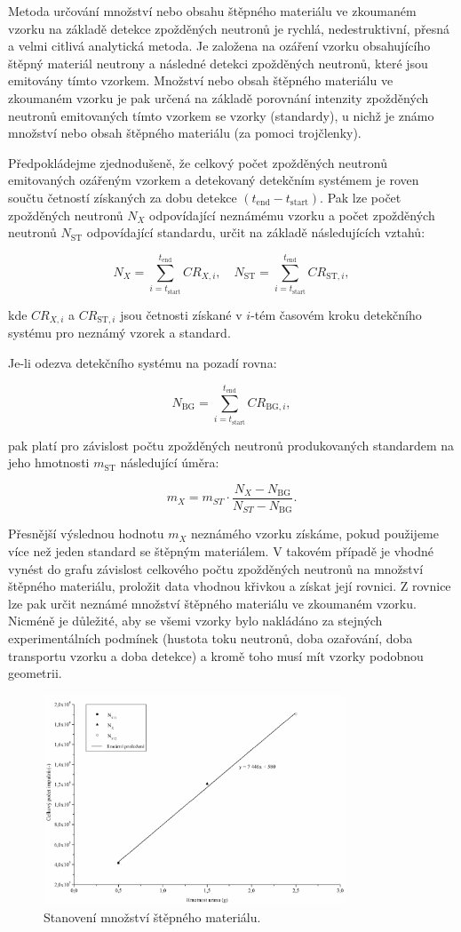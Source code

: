 Metoda určování množství nebo obsahu štěpného materiálu ve zkoumaném vzorku na základě detekce zpožděných neutronů je rychlá, nedestruktivní, přesná a velmi citlivá analytická metoda. Je založena na ozáření vzorku obsahujícího štěpný materiál neutrony a následné detekci zpožděných neutronů, které jsou emitovány tímto vzorkem. Množství nebo obsah štěpného materiálu ve zkoumaném vzorku je pak určená na základě porovnání intenzity zpožděných neutronů emitovaných tímto vzorkem se vzorky (standardy), u nichž je známo množství nebo obsah štěpného materiálu (za pomoci trojčlenky).

Předpokládejme zjednodušeně, že celkový počet zpožděných neutronů emitovaných ozářeným vzorkem a detekovaný detekčním systémem je roven součtu četností získaných za dobu detekce $(t_\text{end} - t_\text{start})$. Pak lze počet zpožděných neutronů $N_X$ odpovídající neznámému vzorku a počet zpožděných neutronů $N_\text{ST}$ odpovídající standardu, určit na základě následujících vztahů:

\[
N_X = \sum_{i = t_\text{start}}^{t_\text{end}} CR_{X,i}, \quad N_\text{ST} = \sum_{i = t_\text{start}}^{t_\text{end}} CR_{\text{ST},i},
\]

kde $CR_{X,i}$ a $CR_{\text{ST},i}$ jsou četnosti získané v $i$-tém časovém kroku detekčního systému pro neznámý vzorek a standard.

Je-li odezva detekčního systému na pozadí rovna:

\[
N_\text{BG} = \sum_{i = t_\text{start}}^{t_\text{end}} CR_{\text{BG},i},
\]

pak platí pro závislost počtu zpožděných neutronů produkovaných standardem na jeho hmotnosti $m_\text{ST}$ následující úměra:

\begin{equation}
m_X = m_{ST} \cdot \frac{N_X - N_\text{BG}}{N_{ST}-N_\text{BG}}.
\end{equation}

Přesnější výslednou hodnotu $m_X$ neznámého vzorku získáme, pokud použijeme více než jeden standard se štěpným materiálem. V takovém případě je vhodné vynést do grafu závislost celkového počtu zpožděných neutronů na množství štěpného materiálu, proložit data vhodnou křivkou a získat její rovnici. Z rovnice lze pak určit neznámé množství štěpného materiálu ve zkoumaném vzorku. Nicméně je důležité, aby se všemi vzorky bylo nakládáno za stejných experimentálních podmínek (hustota toku neutronů, doba ozařování, doba transportu vzorku a doba detekce) a kromě toho musí mít vzorky podobnou geometrii.

\begin{figure}[H] 
    \centering
    \includegraphics[width=0.8\textwidth]{img/ZpožděnéNeutrony3.png}
    \caption{Stanovení množství štěpného materiálu.}
    \label{fig:ŠtěpnýMateriál}
\end{figure}